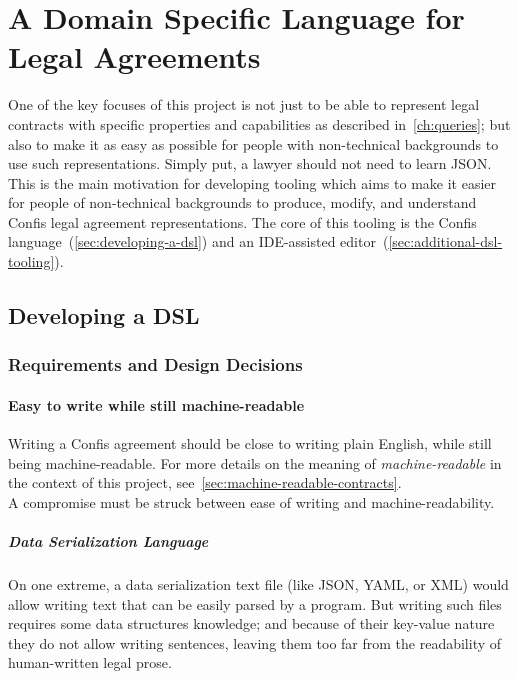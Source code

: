 \chapter{A Domain Specific Language for Legal Agreements}\label{ch:lang}

One of the key focuses of this project is not just to be able to represent legal contracts with specific properties and capabilities as described in~\autoref{ch:queries};
but also to make it as easy as possible for people with non-technical backgrounds to use such representations.
Simply put, a lawyer should not need to learn JSON.\\

This is the main motivation for developing tooling which aims to make it easier for people of non-technical backgrounds to produce, modify, and understand Confis legal agreement representations.
The core of this tooling is the Confis language~(\autoref{sec:developing-a-dsl}) and an IDE-assisted editor~(\autoref{sec:additional-dsl-tooling}).


\section{Developing a DSL}\label{sec:developing-a-dsl}

\subsection{Requirements and Design Decisions}\label{subsec:dsl:requirements}

\subsubsection{Easy to write while still machine-readable}

Writing a Confis agreement should be close to writing plain English, while still being machine-readable.
For more details on the meaning of \emph{machine-readable} in the context of this project, see~\autoref{sec:machine-readable-contracts}.\\


A compromise must be struck between ease of writing and machine-readability.

\paragraph{Data Serialization Language}

On one extreme, a data serialization text file (like JSON, YAML, or XML) would allow writing text that can be easily parsed by a program.
But writing such files requires some data structures knowledge;
and because of their key-value nature they do not allow writing sentences, leaving them too far from the readability of human-written legal prose.

